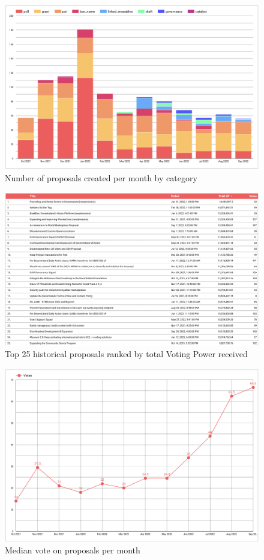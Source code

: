 \documentclass[MSE,Master,english]{twbook}%
\begin{document}
\begin{figure}[H]
  \centering
  \includegraphics[width=\textwidth]{metrics/proposals_by_month.png}
  \caption{Number of proposals created per month by category}
  \label{fig:proposals_by_month}
\end{figure}
\begin{figure}[H]
  \centering
  \includegraphics[width=\textwidth]{metrics/top_proposals.png}
  \caption{Top 25 historical proposals ranked by total Voting Power received}
  \label{fig:top_proposals}
\end{figure}
\begin{figure}[H]
  \centering
  \includegraphics[width=\textwidth]{metrics/median_votes.png}
  \caption{Median vote on proposals per month}
  \label{fig:median_votes}
\end{figure}
\end{document}
